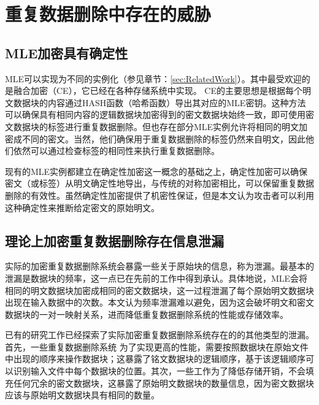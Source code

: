 \section{重复数据删除中存在的威胁}

\subsection{MLE加密具有确定性}

MLE可以实现为不同的实例化（参见章节：\ref{sec:RelatedWork}）。其中最受欢迎的是融合加密（CE），它已经在各种存储系统中实现。 CE的主要思想是根据每个明文数据块的内容通过HASH函数（哈希函数）导出其对应的MLE密钥。这种方法可以确保具有相同内容的逻辑数据块加密得到的密文数据块始终一致，即可使用密文数据块的标签进行重复数据删除。但也存在部分MLE实例允许将相同的明文加密成不同的密文。当然，他们确保用于重复数据删除的标签仍然来自明文，因此他们依然可以通过检查标签的相同性来执行重复数据删除。
 

现有的MLE实例都建立在确定性加密这一概念的基础之上，确定性加密可以确保密文（或标签）从明文确定性地导出，与传统的对称加密相比，可以保留重复数据删除的有效性。虽然确定性加密提供了机密性保证，但是本文认为攻击者可以利用这种确定性来推断给定密文的原始明文。

\subsection{理论上加密重复数据删除存在信息泄漏}

实际的加密重复数据删除系统会暴露一些关于原始块的信息，称为泄漏。最基本的泄漏是数据块的频率，这一点已在先前的工作中得到承认。具体地说，MLE会将相同的明文数据块加密成相同的密文数据块，这一过程泄漏了每个原始明文数据块出现在输入数据中的次数。本文认为频率泄漏难以避免，因为这会破坏明文和密文数据块的一对一映射关系，进而降低重复数据删除系统的性能或存储效率。

已有的研究工作已经探索了实际加密重复数据删除系统存在的的其他类型的泄漏。首先，一些重复数据删除系统   为了实现更高的性能，需要按照数据块在原始文件中出现的顺序来操作数据块；这暴露了铭文数据块的逻辑顺序，基于该逻辑顺序可以识别输入文件中每个数据块的位置。其次，一些工作为了降低存储开销，不会填充任何冗余的密文数据块，这暴露了原始明文数据块的数量信息，因为密文数据块应该与原始明文数据块具有相同的数量。

